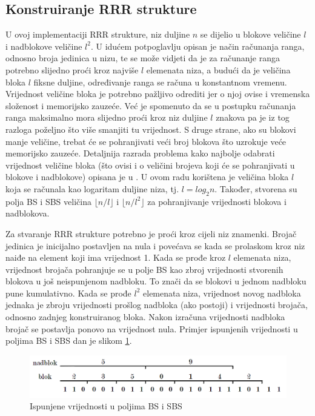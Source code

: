\subsection{Konstruiranje RRR strukture}
U ovoj implementaciji RRR strukture, niz duljine $n$ se dijelio u blokove veličine $l$ i nadblokove veličine $l^2$. U idućem potpoglavlju opisan je način računanja ranga, odnosno broja jedinica u nizu, te se može vidjeti da je za računanje ranga potrebno slijedno proći kroz najviše $l$ elemenata niza, a budući da je veličina bloka $l$ fiksne duljine, određivanje ranga se računa u konstantnom vremenu. Vrijednost veličine bloka je potrebno pažljivo odrediti jer o njoj ovise i vremenska složenost i memorijsko zauzeće. Već je spomenuto da se u postupku računanja ranga maksimalno mora slijedno proći kroz niz duljine $l$ znakova pa je iz tog razloga poželjno što više smanjiti tu vrijednost. S druge strane, ako su blokovi manje veličine, trebat će se pohranjivati veći broj blokova što uzrokuje veće memorijsko zauzeće. Detaljnija razrada problema kako najbolje odabrati vrijednost veličine bloka (što ovisi i o veličini brojeva koji će se pohranjivati u blokove i nadblokove) opisana je u \cite{fm3}. U ovom radu korištena je veličina bloka $l$ koja se računala kao logaritam duljine niza, tj. $l=log_2 n$. Također, stvorena su polja BS i SBS veličina $\lfloor n/l \rfloor$ i $\lfloor n/l^{2} \rfloor$ za pohranjivanje vrijednosti blokova i nadblokova. 

Za stvaranje RRR strukture potrebno je proći kroz cijeli niz znamenki. Brojač jedinica je inicijalno postavljen na nula i povećava se kada se prolaskom kroz niz naiđe na element koji ima vrijednost 1. Kada se prođe kroz $l$ elemenata niza, vrijednost brojača pohranjuje se u polje BS kao zbroj vrijednosti stvorenih blokova u još neispunjenom nadbloku. To znači da se blokovi u jednom nadbloku pune kumulativno. Kada se prođe $l^2$ elemenata niza, vrijednost novog nadbloka jednaka je zbroju vrijednosti prošlog nadbloka (ako postoji) i vrijednosti brojača, odnosno zadnjeg konstruiranog bloka. Nakon izračuna vrijednosti nadbloka brojač se postavlja ponovo na vrijednost nula. Primjer ispunjenih vrijednosti u poljima BS i SBS dan je slikom \ref{rrr1}.

\begin{figure}[H]
\centering
\includegraphics[width=\linewidth]{./pictures/rrr1.png}
\caption{Ispunjene vrijednosti u poljima BS i SBS}\label{rrr1}
\end{figure}

